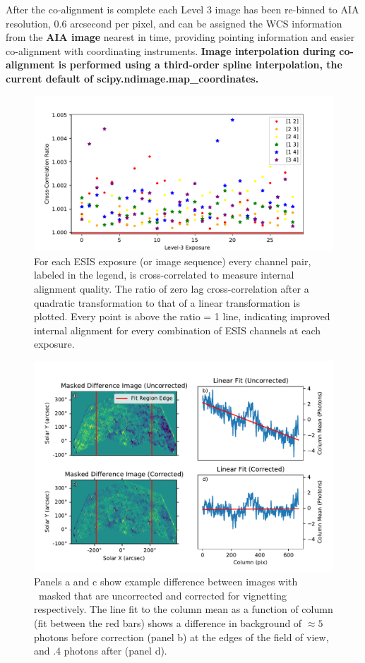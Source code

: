 \documentclass[linenumbers,trackchanges]{aastex63}
\begin{document}
After the co-alignment is complete each Level 3 image has been re-binned to AIA resolution, 0.6 arcsecond per pixel, and can be assigned the WCS information \citep{WCS} from the \textbf{AIA image} nearest in time, providing pointing information and easier co-alignment with coordinating instruments.
\textbf{Image interpolation during co-alignment is performed using a third-order spline interpolation, the current default of scipy.ndimage.map\_coordinates.}



 \begin{figure}
	\centering
	\includegraphics{internal_align.pdf}
	\caption{For each ESIS exposure (or image sequence) every channel pair, labeled in the legend, is cross-correlated to measure internal alignment quality.  The ratio of zero lag cross-correlation after a quadratic transformation to that of a linear transformation is plotted.  Every point is above the ratio = 1 line, indicating improved internal alignment for every combination of ESIS channels at each exposure.}
	\label{fig:cc}	
\end{figure}

 \begin{figure}
	\centering
	\includegraphics{vig_correct.pdf}
	\caption{Panels a and c show example difference between images with \mgxbright \ masked that are uncorrected and corrected for vignetting respectively.  The line fit to the column mean as a function of column (fit between the red bars) shows a difference in background of $\approx 5$ photons before correction (panel b) at the edges of the field of view, and .4 photons after (panel d). }
	\label{fig:vig_correct}
\end{figure}
\end{document}
